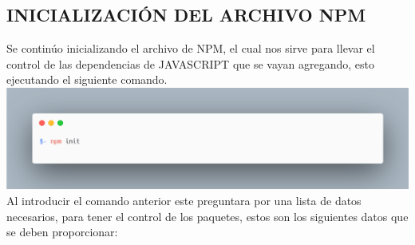 \subsection{INICIALIZACIÓN DEL ARCHIVO NPM}
Se continúo inicializando el archivo de NPM, el cual nos sirve para llevar el control de las dependencias de JAVASCRIPT que se vayan agregando, esto ejecutando el siguiente comando.
\newline
\newline
\includegraphics[width=1\textwidth]{./Imagenes/image11.png}
\newline
Al introducir el comando anterior este preguntara por una lista de datos necesarios, para tener el control de los paquetes, estos son los siguientes datos que se deben proporcionar:
